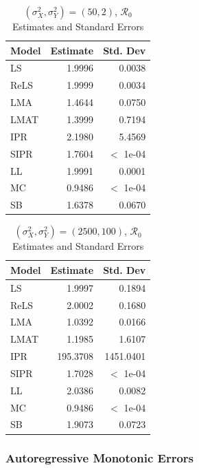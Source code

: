 \documentclass[12pt]{article}
\newcommand{\rr}{\ensuremath{\mathcal{R}_0}}
\begin{document}
\begin{table}[H]
	
	
	\centering
	\begin{tabular}[t]{l|r|r}
		\hline
		Model & Estimate & Std. Dev\\
		\hline
		LS & 1.9996 & 0.0038\\
		\hline
		ReLS & 1.9999 & 0.0034\\
		\hline
		LMA & 1.4644 & 0.0750\\
		\hline
		LMAT & 1.3999 & 0.7194\\
		\hline
		IPR & 2.1980 & 5.4569\\
		\hline
		SIPR & 1.7604 & $<$ 1e-04\\
		\hline
		LL & 1.9991 & 0.0001\\
		\hline
		MC & 0.9486 & $<$ 1e-04\\
		\hline
		SB & 1.6378 & 0.0670\\
		\hline
	\end{tabular}
	\caption{ $(\sigma^2_X, \sigma^2_Y) = (50, 2)$, $\rr$ Estimates and Standard Errors}
\end{table}

\begin{table}[H]
	
	
	\centering
	\begin{tabular}[t]{l|r|r}
		\hline
		Model & Estimate & Std. Dev\\
		\hline
		LS & 1.9997 & 0.1894\\
		\hline
		ReLS & 2.0002 & 0.1680\\
		\hline
		LMA & 1.0392 & 0.0166\\
		\hline
		LMAT & 1.1985 & 1.6107\\
		\hline
		IPR & 195.3708 & 1451.0401\\
		\hline
		SIPR & 1.7028 & $<$ 1e-04\\
		\hline
		LL & 2.0386 & 0.0082\\
		\hline
		MC & 0.9486 & $<$ 1e-04\\
		\hline
		SB & 1.9073 & 0.0723\\
		\hline
	\end{tabular}
	\caption{$(\sigma^2_X, \sigma^2_Y) = (2500, 100)$, $\rr$ Estimates and Standard Errors}
\end{table}

\subsubsection{Autoregressive Monotonic Errors}
\end{document}
